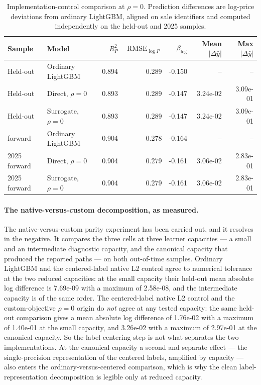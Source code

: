 \documentclass[10pt]{article}
\theoremstyle{definition}
\newcommand{\1}{\mathbf{1}}
\begin{document}
{\begin{table}[!ht]
\centering
\caption{Implementation-control comparison at $\rho=0$. Prediction differences are log-price deviations from ordinary LightGBM, aligned on sale identifiers and computed independently on the held-out and 2025 samples.}
\label{tab:rho_zero_control}
\begin{tabular}{llrrrrr}
\toprule
Sample & Model & $R^2_P$ & $\operatorname{RMSE}_{\log P}$ & $\beta_{\log}$ & Mean $|\Delta\widehat y|$ & Max $|\Delta\widehat y|$ \\
\midrule
Held-out & Ordinary LightGBM & 0.894 & 0.289 & -0.150 & -- & -- \\
Held-out & Direct, $\rho=0$ & 0.893 & 0.289 & -0.147 & 3.24e-02 & 3.09e-01 \\
Held-out & Surrogate, $\rho=0$ & 0.893 & 0.289 & -0.147 & 3.24e-02 & 3.09e-01 \\
\addlinespace
2025 forward & Ordinary LightGBM & 0.904 & 0.278 & -0.164 & -- & -- \\
2025 forward & Direct, $\rho=0$ & 0.904 & 0.279 & -0.161 & 3.06e-02 & 2.83e-01 \\
2025 forward & Surrogate, $\rho=0$ & 0.904 & 0.279 & -0.161 & 3.06e-02 & 2.83e-01 \\
\bottomrule
\end{tabular}
\end{table}
}

\paragraph{The native-versus-custom decomposition, as measured.} The native-versus-custom parity experiment has been
carried out, and it resolves in the negative. It compares the
three cells at three learner capacities --- a small and an intermediate diagnostic capacity, and the
canonical capacity that produced the reported paths --- on both out-of-time samples. Ordinary
LightGBM and the centered-label native L2 control agree to numerical tolerance at the two reduced
capacities: at the small capacity their held-out mean absolute log difference is 7.69e-09 with a
maximum of 2.58e-08, and the intermediate capacity is of the same order. The centered-label native
L2 control and the custom-objective $\rho=0$ origin do \emph{not} agree at any tested capacity: the
same held-out comparison gives a mean absolute log difference of 1.76e-02 with a maximum of
1.40e-01 at the small capacity, and 3.26e-02 with a maximum of 2.97e-01 at the canonical capacity.
So the label-centering step is not what separates the two implementations. At the canonical capacity
a second and separate effect --- the single-precision representation of the centered labels,
amplified by capacity --- also enters the ordinary-versus-centered comparison, which is why the
clean label-representation decomposition is legible only at reduced capacity.
\end{document}
